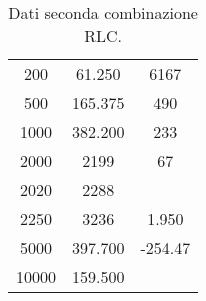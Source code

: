\begin{table}[H]
\begin{minipage}[t]{0.45\textwidth}
\begin{center}
\begin{tabular}{|c|c|c|}
                200 & 61.250 & 6167\\
                500 & 165.375 & 490\\
                1000 & 382.200 & 233\\
                2000 & 2199 & 67\\
                2020 & 2288 & \\
                2250 & 3236 & 1.950\\
                5000 & 397.700 & -254.47\\
                10000 & 159.500 & \\
                \hline
            \end{tabular}
            \caption{Dati seconda combinazione RLC.}
        \end{center}
    \end{minipage}
\end{table}